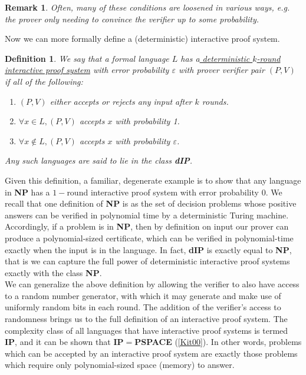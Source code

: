 \documentclass[12pt]{article}
\newtheorem{defn}{Definition}
\newtheorem{rmk}{Remark}
\numberwithin{thm}{section}
\numberwithin{defn}{section}
\numberwithin{prop}{section}
\numberwithin{rmk}{section}
\begin{document}
	\begin{rmk} Often, many of these conditions are loosened in various ways, e.g. the prover only needing to convince the verifier up to some probability.\end{rmk}
	
	Now we can more formally define a (deterministic) interactive proof system.\\
	
	\begin{defn}
	We say that a formal language $L$ has a\underline{ deterministic $k$-round interactive proof system} with error probability $\varepsilon$ with prover verifier pair $(P,V)$ if all of the following:
	\begin{enumerate}[label=(\roman*)]
		\item $(P,V)$ either accepts or rejects any input after $k$ rounds.
		\item $\forall x\in L, (P,V)$ accepts $x$ with probability 1.
		\item $\forall x\notin L, (P,V)$ accepts $x$ with probability $\varepsilon$.
	\end{enumerate}
	Any such languages are said to lie in the class \textbf{dIP}.
	\end{defn}
	Given this definition, a familiar, degenerate example is to show that any language in \textbf{NP} has a $1-$round interactive proof system with error probability $0$. We recall that one definition of \textbf{NP} is as the set of decision problems whose positive answers can be verified in polynomial time by a deterministic Turing machine. Accordingly, if a problem is in \textbf{NP}, then by definition on input our prover can produce a polynomial-sized certificate, which can be verified in polynomial-time exactly when the input is in the language. In fact, \textbf{dIP} is exactly equal to \textbf{NP}, that is we can capture the full power of deterministic interactive proof systems exactly with the class \textbf{NP}.\\
	
	We can generalize the above definition by allowing the verifier to also have access to a random number generator, with which it may generate and make use of uniformly random bits in each round. The addition of the verifier's access to randomness brings us to the full definition of an interactive proof system. The complexity class of all languages that have interactive proof systems is termed \textbf{IP}, and it can be shown that \textbf{IP}$=$\textbf{PSPACE} (\hyperref[kit00]{[Kit00]}). In other words, problems which can be accepted by an interactive proof system are exactly those problems which require only polynomial-sized space (memory) to answer. 
\end{document}

